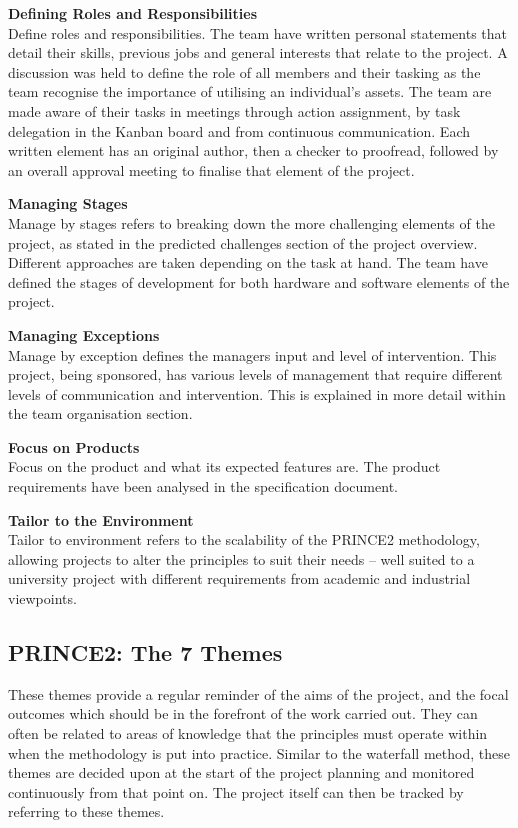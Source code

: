 \documentclass [12pt]{article}
\begin{document}
\textbf{Defining Roles and Responsibilities} \\
Define roles and responsibilities. The team have written personal statements that detail their skills, previous jobs and general interests that relate to the project. A discussion was held to define the role of all members and their tasking as the team recognise the importance of utilising an individual’s assets. The team are made aware of their tasks in meetings through action assignment, by task delegation in the Kanban board and from continuous communication. Each written element has an original author, then a checker to proofread, followed by an overall approval meeting to finalise that element of the project.

\textbf{Managing Stages} \\
Manage by stages refers to breaking down the more challenging elements of the project, as stated in the predicted challenges section of the project overview. Different approaches are taken depending on the task at hand. The team have defined the stages of development for both hardware and software elements of the project.

\textbf{Managing Exceptions}\\
Manage by exception defines the managers input and level of intervention. This project, being sponsored, has various levels of management that require different levels of communication and intervention. This is explained in more detail within the team organisation section.

\textbf{Focus on Products}\\
Focus on the product and what its expected features are. The product requirements have been analysed in the specification document.

\textbf{Tailor to the Environment}\\
Tailor to environment refers to the scalability of the PRINCE2 methodology, allowing projects to alter the principles to suit their needs – well suited to a university project with different requirements from academic and industrial viewpoints.

\subsection{PRINCE2: The 7 Themes}\label{sec:7_themes}
These themes provide a regular reminder of the aims of the project, and the focal outcomes which should be in the forefront of the work carried out. They can often be related to areas of knowledge that the principles must operate within when the methodology is put into practice. Similar to the waterfall method, these themes are decided upon at the start of the project planning and monitored continuously from that point on. The project itself can then be tracked by referring to these themes.
\end{document}
